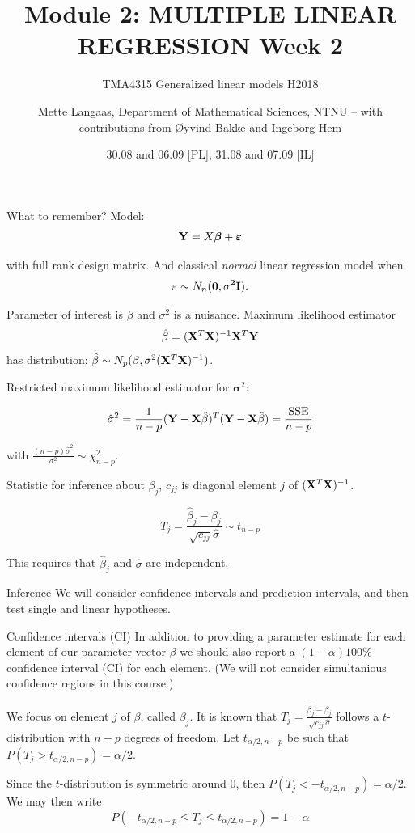 \documentclass[
  ignorenonframetext,
]{beamer}
\title{Module 2: MULTIPLE LINEAR REGRESSION Week 2}
\subtitle{TMA4315 Generalized linear models H2018}
\author{Mette Langaas, Department of Mathematical Sciences, NTNU -- with
contributions from Øyvind Bakke and Ingeborg Hem}
\date{30.08 and 06.09 {[}PL{]}, 31.08 and 07.09 {[}IL{]}}
\begin{document}
\frame{\titlepage}

\begin{frame}
\begin{block}{What to remember?}
\label{what-to-remember}
Model: \[
{\bf Y}= X {\boldsymbol \beta}+\boldsymbol{\varepsilon}
\]

with full rank design matrix. And classical \emph{normal} linear
regression model when \[\varepsilon\sim N_n(\bf{0},\sigma^2\bf{I}).\]

Parameter of interest is \(\beta\) and \(\sigma^2\) is a nuisance.
Maximum likelihood estimator
\[ \hat\beta=({\bf X}^T{\bf X})^{-1} {\bf X}^T {\bf Y}\] has
distribution:
\(\hat{\beta}\sim N_{p}(\beta,\sigma^2({\bf X}^T{\bf X})^{-1})\).

Restricted maximum likelihood estimator for \({\boldsymbol \sigma}^2\):

\[
\hat{\sigma}^2=\frac{1}{n-p}({\bf Y}-{\bf X}\hat{\beta})^T({\bf Y}-{\bf X}\hat{\beta})=\frac{\text{SSE}}{n-p}
\]

with \(\frac{(n-p)\hat{\sigma}^2}{\sigma^2} \sim \chi^2_{n-p}\).
\end{block}
\end{frame}

\begin{frame}
Statistic for inference about \(\beta_j\), \(c_{jj}\) is diagonal
element \(j\) of \(({\bf X}^T{\bf X})^{-1}\).

\[
T_j=\frac{\hat{\beta}_j-\beta_j}{\sqrt{c_{jj}}\hat{\sigma}}\sim t_{n-p}
\]

This requires that \(\hat{\beta}_j\) and \(\hat{\sigma}\) are
independent.
\end{frame}

\begin{frame}{Inference}
\label{inference}
We will consider confidence intervals and prediction intervals, and then
test single and linear hypotheses.
\end{frame}

\begin{frame}
\begin{block}{Confidence intervals (CI)}
\label{confidence-intervals-ci}
In addition to providing a parameter estimate for each element of our
parameter vector \(\beta\) we should also report a \((1-\alpha)100\)\%
confidence interval (CI) for each element. (We will not consider
simultanious confidence regions in this course.)

We focus on element \(j\) of \(\beta\), called \(\beta_j\). It is known
that \(T_j =\frac{\hat{\beta}_j-\beta_j}{\sqrt{c_{jj}}\hat{\sigma}}\)
follows a \(t\)-distribution with \(n-p\) degrees of freedom. Let
\(t_{\alpha/2,n-p}\) be such that \(P(T_j>t_{\alpha/2,n-p})=\alpha/2\).

Since the \(t\)-distribution is symmetric around 0, then
\(P(T_j< -t_{\alpha/2,n-p})=\alpha/2\). We may then write
\[P(-t_{\alpha/2,n-p}\le T_j \le t_{\alpha/2,n-p})=1-\alpha\]
\end{block}
\end{frame}
\end{document}
